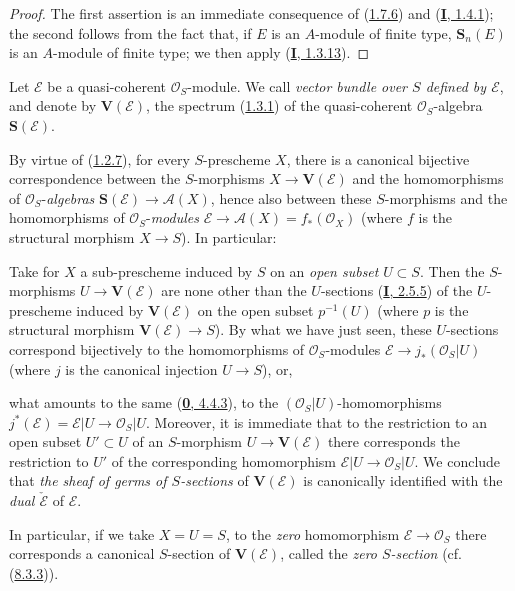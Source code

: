 \begin{proof}
The first assertion is an immediate consequence of
(\hyperref[II.1.7.6]{1.7.6}) and
(\hyperref[I.1.4.1]{\textbf{I}, 1.4.1}); the second follows from the fact that,
if $E$ is an $A$-module of finite type, $\mathbf{S}_n(E)$ is an $A$-module
of finite type; we then apply (\hyperref[I.1.3.13]{\textbf{I}, 1.3.13}).
\end{proof}

\begin{definition}[1.7.8]
\label{II.1.7.8}
Let $\mathcal{E}$ be a quasi-coherent $\mathcal{O}_S$-module. We call
\emph{vector bundle over $S$ defined by $\mathcal{E}$}, and denote by
$\mathbf{V}(\mathcal{E})$, the spectrum
(\hyperref[II.1.3.1]{1.3.1}) of the quasi-coherent $\mathcal{O}_S$-algebra
$\mathbf{S}(\mathcal{E})$.
\end{definition}

By virtue of (\hyperref[II.1.2.7]{1.2.7}), for every $S$-prescheme $X$,
there is a canonical bijective correspondence between the $S$-morphisms
$X\to\mathbf{V}(\mathcal{E})$ and the homomorphisms of
$\mathcal{O}_S$-\emph{algebras} $\mathbf{S}(\mathcal{E})\to\mathcal{A}(X)$, hence
also between these $S$-morphisms and the homomorphisms of
$\mathcal{O}_S$-\emph{modules}
$\mathcal{E}\to\mathcal{A}(X)=f_*(\mathcal{O}_X)$ (where $f$ is the
structural morphism $X\to S$). In particular:

\begin{env}[1.7.9]
\label{II.1.7.9}
Take for $X$ a sub-prescheme induced by $S$ on an \emph{open subset}
$U\subset S$. Then the $S$-morphisms $U\to\mathbf{V}(\mathcal{E})$ are none
other than the $U$-sections (\hyperref[I.2.5.5]{\textbf{I}, 2.5.5}) of the
$U$-prescheme induced by $\mathbf{V}(\mathcal{E})$ on the open subset
$p^{-1}(U)$ (where $p$ is the structural morphism
$\mathbf{V}(\mathcal{E})\to S$). By what we have just seen, these
$U$-sections correspond bijectively to the homomorphisms of
$\mathcal{O}_S$-modules
$\mathcal{E}\to j_*(\mathcal{O}_S|U)$ (where $j$ is the canonical injection
$U\to S$), or,

what amounts to the same (\hyperref[0.4.4.3]{\textbf{0}, 4.4.3}), to the
$(\mathcal{O}_S|U)$-homomorphisms
$j^*(\mathcal{E})=\mathcal{E}|U\to\mathcal{O}_S|U$. Moreover, it is
immediate that to the restriction to an open subset $U'\subset U$ of an
$S$-morphism $U\to\mathbf{V}(\mathcal{E})$ there corresponds the
restriction to $U'$ of the corresponding homomorphism
$\mathcal{E}|U\to\mathcal{O}_S|U$. We conclude that \emph{the sheaf of
germs of $S$-sections} of $\mathbf{V}(\mathcal{E})$ is canonically
identified with the \emph{dual $\check{\mathcal{E}}$} of $\mathcal{E}$.

In particular, if we take $X=U=S$, to the \emph{zero} homomorphism
$\mathcal{E}\to\mathcal{O}_S$ there corresponds a canonical $S$-section of
$\mathbf{V}(\mathcal{E})$, called the \emph{zero $S$-section}
(cf. (\hyperref[II.8.3.3]{8.3.3})).
\end{env}

